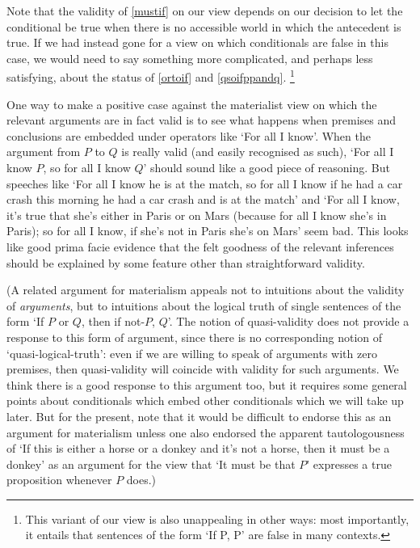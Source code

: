 \documentclass[If.tex]{subfiles}
\begin{document}
Note that the validity of \ref{mustif} on our view depends on our decision to let the conditional be true when there is no accessible world in which the antecedent is true. If we had instead gone for a view on which conditionals are false in this case, we would need to say something more complicated, and perhaps less satisfying, about the status of \ref{ortoif} and \ref{qsoifppandq}.%
\footnote{This variant of our view is also unappealing in other ways: most importantly, it entails that sentences of the form ‘If P, P’ are false in many contexts.}

One way to make a positive case against the materialist view on which the relevant arguments are in fact valid is to see what happens when premises and conclusions are embedded under operators like ‘For all I know’. When the argument from $P$ to $Q$ is really valid (and easily recognised as such), ‘For all I know $P$, so for all I know $Q$’ should sound like a good piece of reasoning. But speeches like ‘For all I know he is at the match, so for all I know if he had a car crash this morning he had a car crash and is at the match’ and ‘For all I know, it's true that she's either in Paris or on Mars (because for all I know she's in Paris); so for all I know, if she's not in Paris she's on Mars’ seem bad. This looks like good prima facie evidence that the felt goodness of the relevant inferences should be explained by some feature other than straightforward validity.

(A related argument for materialism appeals not to intuitions about the validity of \emph{arguments}, but to intuitions about the logical truth of single sentences of the form ‘If $P$ or $Q$, then if not-$P$, $Q$’. The notion of quasi-validity does not provide a response to this form of argument, since there is no corresponding notion of ‘quasi-logical-truth’: even if we are willing to speak of arguments with zero premises, then quasi-validity will coincide with validity for such arguments. We think there is a good response to this argument too, but it requires some general points about conditionals which embed other conditionals which we will take up later.  
But for the present, note that it would be difficult to endorse this as an argument for materialism unless one also endorsed the apparent tautologousness of ‘If this is either a horse or a donkey and it's not a horse, then it must be a donkey’ as an argument for the view that ‘It must be that $P$’ expresses a true proposition whenever $P$ does.)
\end{document}
